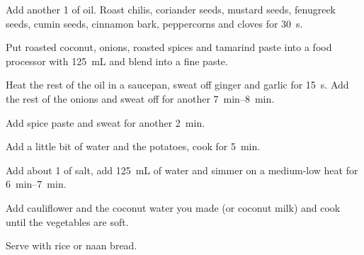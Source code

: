 \begin{recipe}
{		\step Add another \SI{1}{\tablespoon} of oil. Roast chilis, coriander seeds, mustard seeds, fenugreek seeds, cumin seeds, cinnamon bark, peppercorns and cloves for \SI{30}{\second}.

		\step Put roasted coconut, onions, roasted spices and tamarind paste into a food processor with \SI{125}{\milli\liter} and blend into a fine paste.

		\step Heat the rest of the oil in a saucepan, sweat off ginger and garlic for \SI{15}{\second}. Add the rest of the onions and sweat off for another \SIrange{7}{8}{\minute}.

		\step Add spice paste and sweat for another \SI{2}{\minute}.

		\vspace{1em}

		\step Add a little bit of water and the potatoes, cook for \SI{5}{\minute}.

		\vspace{1em}

		\step Add about \SI{1}{\teaspoon} of salt, add \SI{125}{\milli\liter} of water and simmer on a medium-low heat for \SIrange{6}{7}{\minute}.

		\step Add cauliflower and the coconut water you made (or coconut milk) and cook until the vegetables are soft.

		\step Serve with rice or naan bread.
	}

\end{recipe}